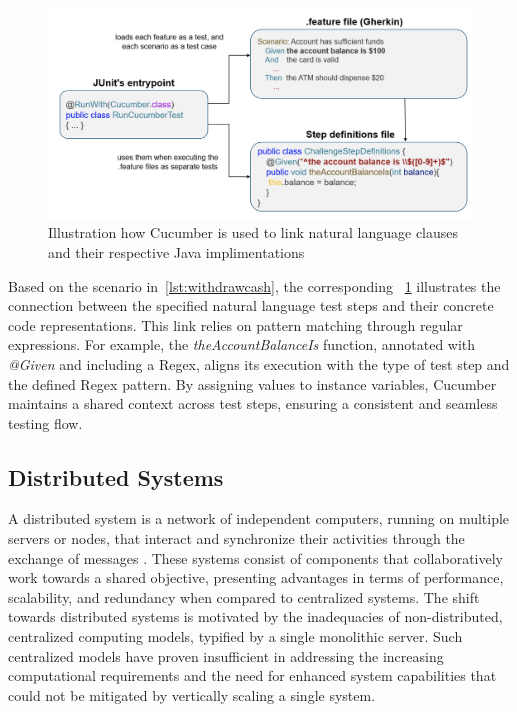 \begin{figure}
    \centering
    \includegraphics[width=\linewidth]{files/figures/cucumber_test_step_mapping.png}
    \caption{Illustration how Cucumber is used to link natural language clauses and their respective Java implimentations}
    \label{fig:cucumber-mapping}
\end{figure}

Based on the scenario in~\cref{lst:withdrawcash}, the corresponding ~\cref{fig:cucumber-mapping} illustrates the connection between the specified natural language test steps and their concrete code representations. This link relies on pattern matching through regular expressions. For example, the \textit{theAccountBalanceIs} function, annotated with \textit{@Given} and including a \ac{Regex}, aligns its execution with the type of test step and the defined \ac{Regex} pattern. By assigning values to instance variables, Cucumber maintains a shared context across test steps, ensuring a consistent and seamless testing flow.

\subsection{Distributed Systems}
\label{subsec:dissys}
A distributed system is a network of independent computers, running on multiple servers or nodes, that interact and synchronize their activities through the exchange of messages \cite{tanenbaum2007distributed}. These systems consist of components that collaboratively work towards a shared objective, presenting advantages in terms of performance, scalability, and redundancy when compared to centralized systems. The shift towards distributed systems is motivated by the inadequacies of non-distributed, centralized computing models, typified by a single monolithic server. Such centralized models have proven insufficient in addressing the increasing computational requirements and the need for enhanced system capabilities that could not be mitigated by vertically scaling a single system.

